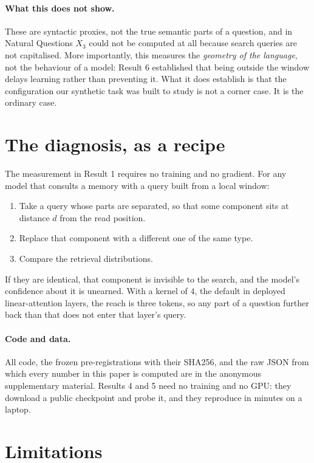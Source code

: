 \documentclass[10pt]{article}
\begin{document}
\paragraph{What this does not show.} These are syntactic proxies, not the true semantic parts of a
question, and in Natural Questions $X_3$ could not be computed at all because search queries are not
capitalised. More importantly, this measures the \emph{geometry of the language}, not the behaviour of
a model: Result 6 established that being outside the window delays learning rather than preventing it.
What it does establish is that the configuration our synthetic task was built to study is not a corner
case. It is the ordinary case.


\section{The diagnosis, as a recipe}

The measurement in Result 1 requires no training and no gradient. For any model that consults a memory
with a query built from a local window:

\begin{enumerate}
\item Take a query whose parts are separated, so that some component sits at distance $d$ from the read
position.
\item Replace that component with a different one of the same type.
\item Compare the retrieval distributions.
\end{enumerate}

If they are identical, that component is invisible to the search, and the model's confidence about it
is unearned. With a kernel of $4$, the default in deployed linear-attention layers, the reach is three
tokens, so any part of a question further back than that does not enter that layer's query.

\paragraph{Code and data.} All code, the frozen pre-registrations with their SHA256, and the raw JSON
from which every number in this paper is computed are in the anonymous supplementary material.
Results 4 and 5 need no training and no GPU: they download a public checkpoint and probe it, and they
reproduce in minutes on a laptop.

\section{Limitations}
\end{document}
